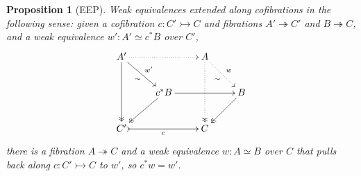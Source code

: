 \documentclass[12pt]{article}
\newcommand{\mono}{\ensuremath{\rightarrowtail}}
\newcommand{\onto}{\ensuremath{\twoheadrightarrow}}
\newtheorem{proposition}[theorem]{Proposition}
\theoremstyle{remark}
\theoremstyle{definition}
\begin{document}
\begin{proposition}[EEP]\label{prop:EEP}
Weak equivalences extended along cofibrations in the following sense: given a cofibration $c:C' \mono C$ and fibrations $A'\onto C'$ and $B\onto C$, and a weak equivalence $w':A' \simeq c^*B$ over $C'$,
\begin{equation}\label{diag:EEP}
\xymatrix{
A' \ar@{->>}[dd] \ar[rd]_{\sim}^{w'} \ar@{..>}[rr] && A \ar@{..>>}[dd] \ar@{..>}[rd]_{\sim}^{w} \\
& c^*B \ar@{->>}[ld] \ar[rr]  && B \ar@{->>}[ld] \\
C' \ar@{>->}[rr]_c && C
}
\end{equation}
there is a fibration $A\onto C$ and a weak equivalence $w: A \simeq B$ over $C$ that pulls back along $c:C' \mono C$ to $w'$, so $c^*w = w'$.

\end{proposition}
%
\end{document}
